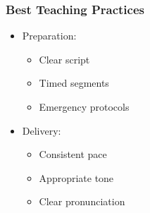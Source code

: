 \begin{frame}[fragile]\frametitle{Best Teaching Practices}
    \begin{itemize}
        \item Preparation:
            \begin{itemize}
                \item Clear script
                \item Timed segments
                \item Emergency protocols
            \end{itemize}
        \item Delivery:
            \begin{itemize}
                \item Consistent pace
                \item Appropriate tone
                \item Clear pronunciation
            \end{itemize}
    \end{itemize}
\end{frame}


